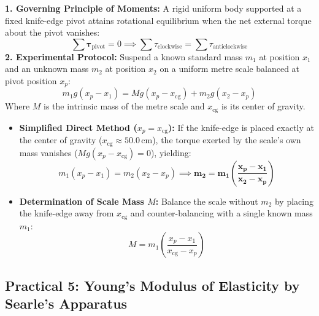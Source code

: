 \documentclass[10pt,twoside,openright]{book}
\begin{document}
\begin{formulabox}
\textbf{1. Governing Principle of Moments:}
A rigid uniform body supported at a fixed knife-edge pivot attains rotational equilibrium when the net external torque about the pivot vanishes:
\begin{equation}
  \sum \boldsymbol{\tau}_{\text{pivot}} = 0 \implies \sum \tau_{\text{clockwise}} = \sum \tau_{\text{anticlockwise}}
\end{equation}
\textbf{2. Experimental Protocol:}
Suspend a known standard mass $m_1$ at position $x_1$ and an unknown mass $m_2$ at position $x_2$ on a uniform metre scale balanced at pivot position $x_p$:
\begin{equation}
  m_1 g (x_p - x_1) = M g (x_p - x_{\text{cg}}) + m_2 g (x_2 - x_p)
\end{equation}
Where $M$ is the intrinsic mass of the metre scale and $x_{\text{cg}}$ is its center of gravity.
\begin{itemize}
  \item \textbf{Simplified Direct Method ($x_p = x_{\text{cg}}$):} If the knife-edge is placed exactly at the center of gravity ($x_{\text{cg}} \approx 50.0\,\mathrm{cm}$), the torque exerted by the scale's own mass vanishes ($M g(x_p - x_{\text{cg}}) = 0$), yielding:
  \begin{equation}
    m_1 (x_p - x_1) = m_2 (x_2 - x_p) \implies \mathbf{m_2 = m_1 \left(\frac{x_p - x_1}{x_2 - x_p}\right)}
  \end{equation}
  \item \textbf{Determination of Scale Mass $M$:} Balance the scale without $m_2$ by placing the knife-edge away from $x_{\text{cg}}$ and counter-balancing with a single known mass $m_1$:
  \begin{equation}
    M = m_1 \left(\frac{x_p - x_1}{x_{\text{cg}} - x_p}\right)
  \end{equation}
\end{itemize}
\end{formulabox}

\subsection{Practical 5: Young's Modulus of Elasticity by Searle's Apparatus}
\end{document}
